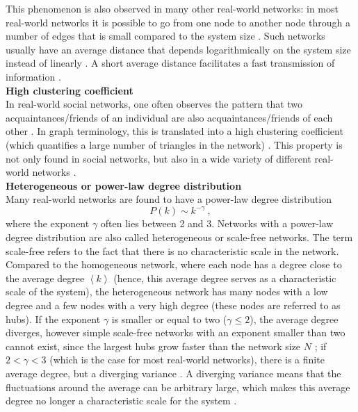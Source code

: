 \documentclass[11 pt , letterpaper , twoside , openright]{book}
\begin{document}
\newline
This phenomenon is also observed in many other real-world networks: in most real-world networks it is possible to go from one node to another node through a number of edges that is small compared to the system size \cite{RealWorld}. Such networks usually have an average distance that depends logarithmically on the system size instead of linearly \cite{Newman2003}. A short average distance facilitates a fast transmission of information \cite{Newman2003}\cite{Zhang2014}.\\
\newline
\textbf{High clustering coefficient}\\
\newline
In real-world social networks, one often observes the pattern that two acquaintances/friends of an individual are also acquaintances/friends of each other \cite{RealWorld}. In graph terminology, this is translated into a high clustering coefficient (which quantifies a large number of triangles in the network) \cite{RealWorld}. This property is not only found in social networks, but also in a wide variety of different real-world networks \cite{RealWorld}.\\
\newline
\textbf{Heterogeneous or power-law degree distribution}\\
\newline
Many real-world networks are found to have a power-law degree distribution \cite{RealWorld}
\begin{equation}
	P(k) \sim k^{-\gamma} \ ,
\end{equation}
where the exponent $\gamma$ often lies between 2 and 3. Networks with a power-law degree distribution are also called heterogeneous or scale-free networks. The term scale-free refers to the fact that there is no characteristic scale in the network. Compared to the homogeneous network, where each node has a degree close to the average degree $\left<k\right>$ (hence, this average degree serves as a characteristic scale of the system), the heterogeneous network has many nodes with a low degree and a few nodes with a very high degree (these nodes are referred to as hubs). If the exponent $\gamma$ is smaller or equal to two ($\gamma \leqslant 2$), the average degree diverges, however simple scale-free networks with an exponent smaller than two cannot exist, since the largest hubs grow faster than the network size $N$ \cite{Barabasi2016}; if $2 < \gamma < 3$ (which is the case for most real-world networks), there is a finite average degree, but a diverging variance \cite{Newman2005}. A diverging variance means that the fluctuations around the average can be arbitrary large, which makes this average degree no longer a characteristic scale for the system \cite{Barabasi2016}.\\
\end{document}
